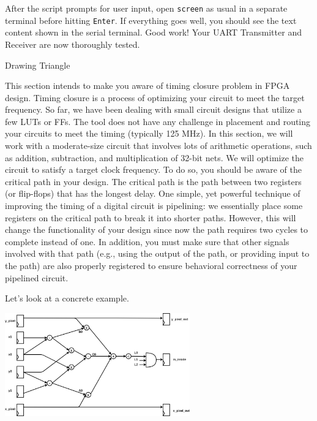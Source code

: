 \documentclass[11pt]{article}
\makeatletter
\renewcommand{\section}
{\@startsection {section}{1}{0pt}
 {-2ex}
 {1ex}
 {\bfseries\Large}}
\makeatother
\begin{document}
After the script prompts for user input, open \verb|screen| as usual in a separate terminal before hitting \texttt{Enter}. If everything goes well, you should see the text content shown in the serial terminal. Good work! Your UART Transmitter and Receiver are now thoroughly tested.

\section{Drawing Triangle}

This section intends to make you aware of timing closure problem in FPGA design. Timing closure is a process of optimizing your circuit to meet the target frequency. So far, we have been dealing with small circuit designs that utilize a few LUTs or FFs. The tool does not have any challenge in placement and routing your circuits to meet the timing (typically 125 MHz). In this section, we will work with a moderate-size circuit that involves lots of arithmetic operations, such as addition, subtraction, and multiplication of 32-bit nets. We will optimize the circuit to satisfy a target clock frequency. To do so, you should be aware of the critical path in your design. The critical path is the path between two registers (or flip-flops) that has the longest delay. One simple, yet powerful technique of improving the timing of a digital circuit is pipelining: we essentially place some registers on the critical path to break it into shorter paths. However, this will change the functionality of your design since now the path requires two cycles to complete instead of one. In addition, you must make sure that other signals involved with that path (e.g., using the output of the path, or providing input to the path) are also properly registered to ensure behavioral correctness of your pipelined circuit.


Let's look at a concrete example.

\begin{center}
\includegraphics[width=0.6\textwidth]{figs/point_in_triangle.png}
\end{center}
\end{document}
